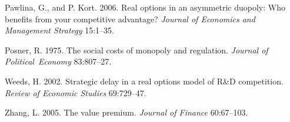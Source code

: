 \documentclass[nogrid,nosurname,sort&compress]{RFS}
\begin{document}
\begin{thebibliography}{}
 Pawlina, G., and P. Kort.
2006. Real options in an asymmetric duopoly: Who benefits from your competitive advantage?
\textit{Journal of Economics and Management Strategy} 15:{}\hbox{1--35}.

 Posner, R. 1975. The social costs of
monopoly and regulation. \textit{Journal of Political\ Economy} 83:807--27.

 Weeds, H. 2002. Strategic delay in a real
options model of R\&D competition. \textit{Review of Economic Studies} 69:729--47.

 Zhang, L. 2005. The value premium. \textit{Journal of Finance} 60:67--103.
\end{thebibliography}

%
%
%
\end{document}
